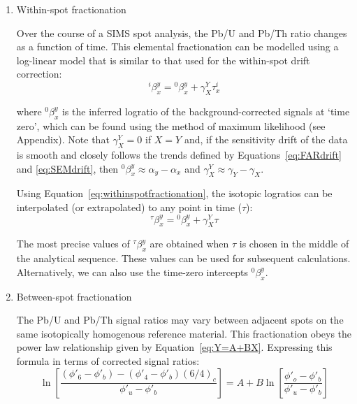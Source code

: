 \documentclass{article}
\begin{document}
\begin{enumerate}

\item{Within-spot fractionation}

Over the course of a SIMS spot analysis, the Pb/U and Pb/Th ratio
changes as a function of time. This elemental fractionation can be
modelled using a log-linear model that is similar to that used for the
within-spot drift correction:
\begin{equation}
  {}^{i}\!\beta^{y}_{x} = {}^{0}\!\beta^{y}_{x} + \gamma^{Y}_{X} \tau^i_x
  \label{eq:withinspotfractionation}
\end{equation}

\noindent where ${}^{0}\!\beta^{y}_{x}$ is the inferred logratio of
the background-corrected signals at `time zero', which can be found
using the method of maximum likelihood (see Appendix).  Note that
$\gamma_X^Y=0$ if $X=Y$ and, if the sensitivity drift of the data is
smooth and closely follows the trends defined by
Equations~\ref{eq:FARdrift} and \ref{eq:SEMdrift}, then
${}^{0}\beta_x^y \approx \alpha_y - \alpha_x$ and $\gamma^{Y}_{X}
\approx \gamma_Y - \gamma_X$.\medskip

Using Equation~\ref{eq:withinspotfractionation}, the isotopic logratios
can be interpolated (or extrapolated) to any point in time ($\tau$):
\begin{equation}
  {}^{\tau}\!\beta^{y}_{x} = {}^{0}\!\beta^{y}_{x} + \gamma^{Y}_{X} \tau
  \label{eq:betatau}
\end{equation}

The most precise values of ${}^{\tau}\!\beta^{y}_{x}$ are obtained
when $\tau$ is chosen in the middle of the analytical sequence.  These
values can be used for subsequent calculations.  Alternatively, we can
also use the time-zero intercepts ${}^{0}\!\beta^{y}_{x}$.

\item{Between-spot fractionation}

The Pb/U and Pb/Th signal ratios may vary between adjacent spots on
the same isotopically homogenous reference material. This
fractionation obeys the power law relationship given by
Equation~\ref{eq:Y=A+BX}.  Expressing this formula in terms of
corrected signal ratios:
\begin{equation}
  \ln\!\left[\frac{(\phi'_{6} - \phi'_b) - (\phi'_{4} -
      \phi'_b)(6/4)_c}{\phi'_{u} - \phi'_b}\right] = A + B
  \ln\!\left[\frac{\phi'_{o} - \phi'_b}{\phi'_{u} -
      \phi'_b}\right]
  \label{eq:UOUcalibration}
\end{equation}


\end{enumerate}
\end{document}
